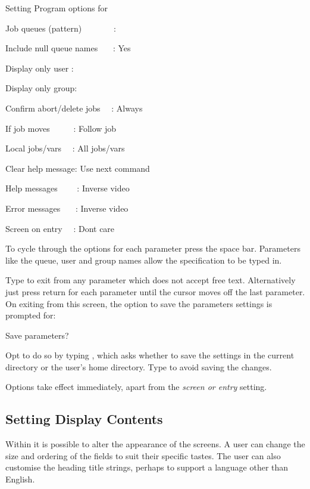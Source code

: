 \begin{exparasmall}

Setting Program options for \BtqName{}

\bigskip


Job queues (pattern) \ \ \ \ \ \ \ :

Include null queue names \ \ \ : Yes

Display only user :

Display only group:

Confirm abort/delete jobs \ \ : Always

If job moves \ \ \ \ \ : Follow job

Local jobs/vars \ \ : All jobs/vars

Clear help message: Use next command

Help messages \ \ \ \ : Inverse video

Error messages \ \ \ : Inverse video

Screen on entry \ \ : Don{\textquotesingle}t care

\end{exparasmall}

To cycle through the options for each parameter press the space bar.
Parameters like the queue, user and group names allow the specification
to be typed in.

Type  to exit from any parameter which does not
accept free text. Alternatively just press return for each parameter
until the cursor moves off the last parameter. On exiting from this
screen, the option to save the parameters settings is prompted for:

\begin{expara}

Save parameters?

\end{expara}

Opt to do so by typing , which asks whether to save the settings in the current directory or the
user's home directory. Type  to avoid saving the changes.

Options take effect immediately, apart from the \textit{screen or entry} setting.

\subsection{Setting Display Contents}
Within \PrBtq{} it is possible to alter the appearance of the screens. A user can change the size and ordering of the fields
to suit their specific tastes. The user can also customise the heading title strings, perhaps to support a language other than English.

